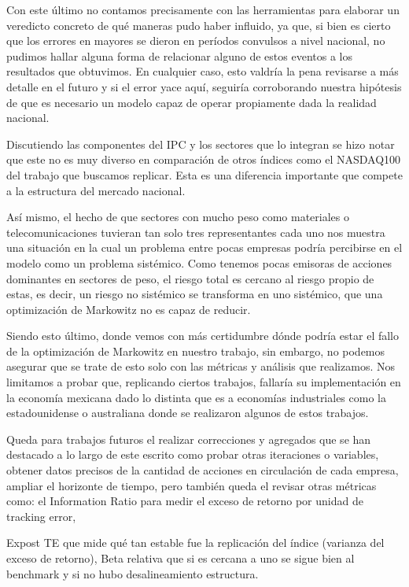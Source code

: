 \documentclass[
]{article}
\begin{document}
Con este último no contamos precisamente con las herramientas para elaborar un
veredicto concreto de qué maneras pudo haber influido, ya que, si bien es cierto que
los errores en mayores se dieron en períodos convulsos a nivel nacional, no
pudimos hallar alguna forma de relacionar alguno de estos eventos a los resultados
que obtuvimos. En cualquier caso, esto valdría la pena revisarse a más detalle en
el futuro y si el error yace aquí, seguiría corroborando nuestra hipótesis de que es
necesario un modelo capaz de operar propiamente dada la realidad nacional.

Discutiendo las componentes del IPC y los sectores que lo integran se hizo notar
que este no es muy diverso en comparación de otros índices como el NASDAQ100
del trabajo que buscamos replicar. Esta es una diferencia importante que compete
a la estructura del mercado nacional.

Así mismo, el hecho de que sectores con mucho peso como materiales o
telecomunicaciones tuvieran tan solo tres representantes cada uno nos muestra una
situación en la cual un problema entre pocas empresas podría percibirse en el
modelo como un problema sistémico. Como tenemos pocas emisoras de acciones
dominantes en sectores de peso, el riesgo total es cercano al riesgo propio de estas,
es decir, un riesgo no sistémico se transforma en uno sistémico, que una
optimización de Markowitz no es capaz de reducir.

Siendo esto último, donde vemos con más certidumbre dónde podría estar el fallo
de la optimización de Markowitz en nuestro trabajo, sin embargo, no podemos
asegurar que se trate de esto solo con las métricas y análisis que realizamos. Nos
limitamos a probar que, replicando ciertos trabajos, fallaría su implementación en la
economía mexicana dado lo distinta que es a economías industriales como la
estadounidense o australiana donde se realizaron algunos de estos trabajos.

Queda para trabajos futuros el realizar correcciones y agregados que se han
destacado a lo largo de este escrito como probar otras iteraciones o variables,
obtener datos precisos de la cantidad de acciones en circulación de cada empresa,
ampliar el horizonte de tiempo, pero también queda el revisar otras métricas como:
el Information Ratio para medir el exceso de retorno por unidad de tracking error,

Expost TE que mide qué tan estable fue la replicación del índice (varianza del
exceso de retorno), Beta relativa que si es cercana a uno se sigue bien al benchmark
y si no hubo desalineamiento estructura.
\end{document}
